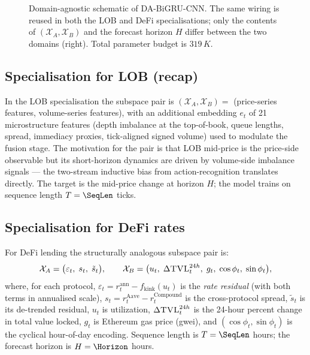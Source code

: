 \begin{figure}[t]
  \caption{Domain-agnostic schematic of DA-BiGRU-CNN. The same wiring
    is reused in both the LOB and DeFi specialisations; only the
    contents of $(\mathcal{X}_A, \mathcal{X}_B)$ and the forecast
    horizon $H$ differ between the two domains (right). Total
    parameter budget is $319\,K$.}
  \label{fig:architecture-dual}
\end{figure}

\subsection{Specialisation for LOB (recap)}
\label{sec:methodology-lob}

In the LOB specialisation \cite{solovev2026lob} the subspace pair is
$(\mathcal{X}_A, \mathcal{X}_B) = $ (price-series features,
volume-series features), with an additional embedding $e_t$ of 21
microstructure features (depth imbalance at the top-of-book, queue
lengths, spread, immediacy proxies, tick-aligned signed volume) used to
modulate the fusion stage. The motivation for the pair is that LOB
mid-price is the price-side observable but its short-horizon dynamics
are driven by volume-side imbalance signals --- the two-stream
inductive bias from action-recognition translates directly. The
target is the mid-price change at horizon $H$; the model trains on
sequence length $T=\SeqLen$ ticks.

\subsection{Specialisation for DeFi rates}
\label{sec:methodology-defi}

For DeFi lending the structurally analogous subspace pair is:
\begin{equation}
\mathcal{X}_A = \bigl(\varepsilon_t,\;
                 s_t,\;
                 \tilde{s}_t \bigr),\qquad
\mathcal{X}_B = \bigl(u_t,\;
                  \Delta\textsc{TVL}_t^{24h},\;
                  g_t,\;
                  \cos\phi_t,\;\sin\phi_t \bigr),
\label{eq:defi-pair}
\end{equation}
where, for each protocol,
$\varepsilon_t = r_t^{\text{ann}} - f_{\text{kink}}(u_t)$ is the
\emph{rate residual} (with both terms in annualised scale),
$s_t = r_t^{\text{Aave}} - r_t^{\text{Compound}}$ is the
cross-protocol spread, $\tilde{s}_t$ is its de-trended residual,
$u_t$ is utilization, $\Delta\textsc{TVL}_t^{24h}$ is the 24-hour
percent change in total value locked, $g_t$ is Ethereum gas price
(gwei), and $(\cos\phi_t, \sin\phi_t)$ is the cyclical hour-of-day
encoding.  Sequence length is $T=\SeqLen$ hours; the forecast horizon
is $H=\Horizon$ hours.

